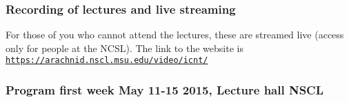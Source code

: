 \documentclass{beamer}
\begin{document}
\begin{frame}
\frametitle{Recording of lectures and live streaming}

\begin{block}{}
For those of you who cannot attend the lectures, these are streamed live (access only for people at the NCSL). The link to the website is \href{{https://arachnid.nscl.msu.edu/video/icnt/}}{\nolinkurl{https://arachnid.nscl.msu.edu/video/icnt/}}
\end{block}
\end{frame}

\begin{frame}
\frametitle{Program first week May 11-15 2015, Lecture hall NSCL}

\begin{block}{}



\end{block}
\end{frame}
\end{document}
